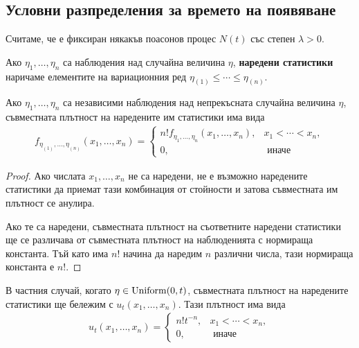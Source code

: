 \documentclass[numbers=endperiod, bibliography=totocnumbered]{scrartcl}
\begin{document}
\subsection{Условни разпределения за времето на появяване}

Считаме, че е фиксиран някакъв поасонов процес \( N(t) \) със степен \( \lambda > 0 \).

\begin{definition}
  Ако \( \eta_1, \ldots, \eta_n \) са наблюдения над случайна величина \( \eta \), \textbf{наредени статистики} наричаме елементите на вариационния ред \( \eta_{(1)} \leq \cdots \leq \eta_{(n)} \).
\end{definition}

\begin{proposition}
  Ако \( \eta_1, \ldots, \eta_n \) са независими наблюдения над непрекъсната случайна величина \( \eta \), съвместната плътност на наредените им статистики има вида
  \begin{align*}
    f_{\eta_{(1)}, \ldots, \eta_{(n)}} (x_1, \ldots, x_n)
    =
    \begin{cases}
      n! f_{\eta_{1}, \ldots, \eta_{n}} (x_1, \ldots, x_n), &x_1 < \cdots < x_n, \\
      0, &\text{ иначе}
    \end{cases}
  \end{align*}
\end{proposition}
\begin{proof}
  Ако числата \( x_1, \ldots, x_n \) не са наредени, не е възможно наредените статистики да приемат тази комбинация от стойности и затова съвместната им плътност се анулира.

  Ако те са наредени, съвместната плътност на съответните наредени статистики ще се различава от съвместната плътност на наблюденията с нормираща константа. Тъй като има \( n \)! начина да наредим \( n \) различни числа, тази нормираща константа е \( n \)!.
\end{proof}

\begin{remark}
  В частния случай, когато \( \eta \in \operatorname{Uniform}(0, t) \), съвместната плътност на наредените статистики ще бележим с \( u_t(x_1, \ldots, x_n) \). Тази плътност има вида
  \begin{align*}
    u_t(x_1, \ldots, x_n)
    =
    \begin{cases}
      n! t^{-n}, &x_1 < \cdots < x_n, \\
      0, &\text{ иначе}
    \end{cases}
  \end{align*}
\end{remark}
\end{document}
